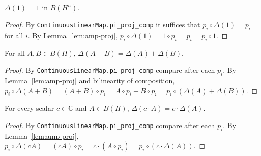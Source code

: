 \begin{lemma}
    \label{lem:amp-map-one}
    \leanok
    $\Delta(1) = 1$ in $B(H^n)$.
\end{lemma}
\begin{proof}
    By \texttt{ContinuousLinearMap.pi\_proj\_comp} it suffices that
    $p_i \circ \Delta(1) = p_i$ for all $i$. By Lemma~\ref{lem:amp-proj},
    $p_i \circ \Delta(1) = 1 \circ p_i = p_i = p_i \circ 1$.
\end{proof}

\begin{lemma}
    \label{lem:amp-map-add}
    \leanok
    For all $A, B \in B(H)$, $\Delta(A + B) = \Delta(A) + \Delta(B)$.
\end{lemma}
\begin{proof}
    By \texttt{ContinuousLinearMap.pi\_proj\_comp} compare after each $p_i$. By
    Lemma~\ref{lem:amp-proj} and bilinearity of composition,
    $p_i \circ \Delta(A + B) = (A + B) \circ p_i = A \circ p_i + B \circ p_i
    = p_i \circ (\Delta(A) + \Delta(B))$.
\end{proof}

\begin{lemma}
    \label{lem:amp-map-smul}
    \leanok
    For every scalar $c \in \mathbb C$ and $A \in B(H)$,
    $\Delta(c \cdot A) = c \cdot \Delta(A)$.
\end{lemma}
\begin{proof}
    By \texttt{ContinuousLinearMap.pi\_proj\_comp} compare after each $p_i$. By
    Lemma~\ref{lem:amp-proj}, $p_i \circ \Delta(c A) = (c A) \circ p_i
    = c \cdot (A \circ p_i) = p_i \circ (c \cdot \Delta(A))$.
\end{proof}

